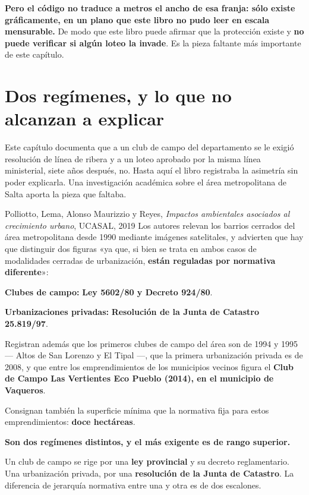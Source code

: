 \textbf{Pero el código no traduce a metros el ancho de esa franja: sólo existe gráficamente, en
un plano que este libro no pudo leer en escala mensurable.} De modo que este libro puede afirmar que la protección existe y
\textbf{no puede verificar si algún loteo la invade}. Es la pieza faltante más importante de
este capítulo.

\section{Dos regímenes, y lo que no alcanzan a explicar}

Este capítulo documenta que a un club de campo del departamento se le exigió resolución de
línea de ribera y a un loteo aprobado por la misma línea ministerial, siete años después, no. Hasta aquí el libro registraba la
asimetría sin poder explicarla. Una investigación académica sobre el área metropolitana de
Salta aporta la pieza que faltaba.

\begin{ficha}{Polliotto, Lema, Alonso Maurizzio y Reyes, \textit{Impactos ambientales asociados al crecimiento urbano}, UCASAL, 2019}
Los autores relevan los barrios cerrados del área metropolitana desde 1990 mediante imágenes
satelitales, y advierten que hay que distinguir dos figuras «ya que, si bien se trata en ambos
casos de modalidades cerradas de urbanización, \textbf{están reguladas por normativa
diferente}»:

\textbf{Clubes de campo:} \textbf{Ley 5602/80 y Decreto 924/80}.

\textbf{Urbanizaciones privadas:} \textbf{Resolución de la Junta de Catastro 25.819/97}.

Registran además que los primeros clubes de campo del área son de 1994 y 1995 --- Altos de
San Lorenzo y El Tipal ---, que la primera urbanización privada es de 2008, y que entre los
emprendimientos de los municipios vecinos figura el \textbf{Club de Campo Las Vertientes Eco
Pueblo (2014), en el municipio de Vaqueros}.

Consignan también la superficie mínima que la normativa fija para estos emprendimientos:
\textbf{doce hectáreas}.
\end{ficha}

\textbf{Son dos regímenes distintos, y el más exigente es de rango superior.}

Un club de campo se rige por una \textbf{ley provincial} y su decreto reglamentario. Una
urbanización privada, por una \textbf{resolución de la Junta de Catastro}. La diferencia de
jerarquía normativa entre una y otra es de dos escalones.

